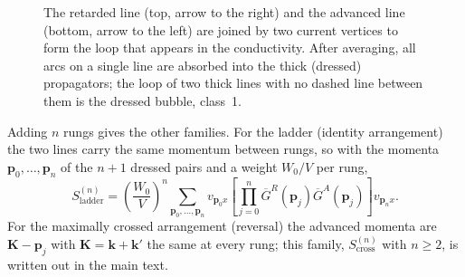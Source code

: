 \begin{figure}[ht]
\centering
{}
\caption{The retarded line (top, arrow to the right) and the
advanced line (bottom, arrow to the left) are joined by two
current vertices to form the loop that appears in the
conductivity. After averaging, all arcs on a single line are
absorbed into the thick (dressed) propagators; the loop of two
thick lines with no dashed line between them is the dressed
bubble, class~1.}
\label{fig:bubble}
\end{figure}

Adding $n$ rungs gives the other families. For the ladder
(identity arrangement) the two lines carry the same momentum
between rungs, so with the momenta
$\mathbf p_0,\dots,\mathbf p_n$ of the $n+1$ dressed pairs and
a weight $W_0/V$ per rung,
\begin{equation}
S^{(n)}_{\mathrm{ladder}}
=
\left(\frac{W_0}{V}\right)^n
\sum_{\mathbf p_0,\dots,\mathbf p_n}
v_{\mathbf p_0x}
\left[
\prod_{j=0}^{n}
\overline G^R(\mathbf p_j)
\overline G^A(\mathbf p_j)
\right]
v_{\mathbf p_nx}.
\label{eq:Sladder}
\end{equation}
For the maximally crossed arrangement (reversal) the advanced
momenta are $\mathbf K-\mathbf p_j$ with
$\mathbf K=\mathbf k+\mathbf k'$ the same at every rung; this
family, $S^{(n)}_{\mathrm{cross}}$ with $n\ge2$, is written out
in the main text.

